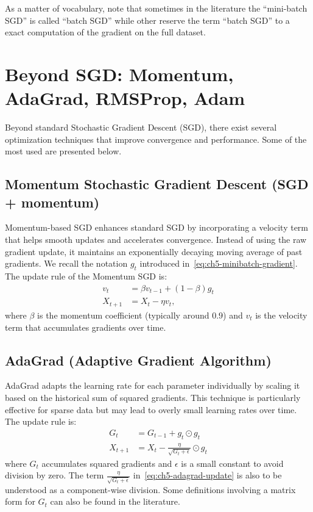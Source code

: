 \begin{remark}\label{rem:ch5-minibatch-vocabulary}
As a matter of vocabulary, note that sometimes in the literature the ``mini-batch SGD'' is called ``batch SGD'' while other reserve the term ``batch SGD'' to a exact computation of the gradient on the full dataset.
\end{remark}

\section{Beyond SGD: Momentum, AdaGrad, RMSProp, Adam}
\label{sec:ch5-beyond-sgd}

Beyond standard Stochastic Gradient Descent (SGD), there exist several optimization techniques that improve convergence and performance. Some of the most used are presented below.

\subsection{Momentum Stochastic Gradient Descent (SGD + momentum)}
\label{subsec:ch5-momentum}

Momentum-based SGD enhances standard SGD by incorporating a velocity term that helps smooth updates and accelerates convergence. Instead of using the raw gradient update, it maintains an exponentially decaying moving average of past gradients. We recall the notation $g_t$ introduced in~\eqref{eq:ch5-minibatch-gradient}. The update rule of the Momentum SGD is:
\begin{align}
v_t &= \beta v_{t-1} + (1 - \beta) g_t \label{eq:ch5-momentum-velocity}\\
X_{t+1} &= X_t - \eta v_t, \label{eq:ch5-momentum-update}
\end{align}
where $\beta$ is the momentum coefficient (typically around $0.9$) and $v_t$ is the velocity term that accumulates gradients over time.

\subsection{AdaGrad (Adaptive Gradient Algorithm)}
\label{subsec:ch5-adagrad}

AdaGrad adapts the learning rate for each parameter individually by scaling it based on the historical sum of squared gradients. This technique is particularly effective for sparse data but may lead to overly small learning rates over time. The update rule is:
\begin{align}
G_t &= G_{t-1} + g_t \odot g_t \label{eq:ch5-adagrad-accum}\\
X_{t+1} &= X_t - \frac{\eta}{\sqrt{G_t + \epsilon}} \odot g_t \label{eq:ch5-adagrad-update}
\end{align}
where $G_t$ accumulates squared gradients and $\epsilon$ is a small constant to avoid division by zero. The term $\frac{\eta}{\sqrt{G_t+\epsilon}}$ in~\eqref{eq:ch5-adagrad-update} is also to be understood as a component-wise division. Some definitions involving a matrix form for $G_t$ can also be found in the literature.

